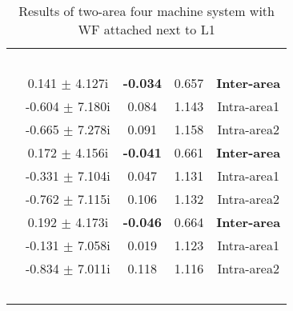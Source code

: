 \documentclass[conference,11pt]{IEEEtran}
\begin{document}
\begin{table}[t]
\centering
\caption{Results of two-area four machine system with WF attached next to L1}
\label{tab:table3}
\renewcommand{\arraystretch}{1}
\begin{tabular}{||c|c|c|c|c||}
\hline \hline
\multirow{2}{*}{\parbox{1.1cm}{\\}}  & 
\multirow{2}{*}{\parbox{1.4cm}{}} & 
\multirow{2}{*}{\parbox{1.1cm}{}} & 
\multirow{2}{*}{\parbox{0.8cm}{}} & 
\multirow{2}{*}{\parbox{1.2cm}{}}  \\
{}       &      {}     &         {} &      {}     &       {} \\ \hline
\hline 
\multirow{3}{*}{\centering {10\%WG}}    &0.141	$\pm$ 4.127i&	\bf{-0.034}&	0.657& \bf{Inter-area}\\
{}                                          &-0.604	$\pm$ 7.180i&	0.084&	1.143& Intra-area1\\
{}                                          &-0.665	$\pm$ 7.278i&	0.091&	1.158& Intra-area2\\ \hline
\multirow{3}{*}{\centering {25\%WG}}   &0.172	$\pm$ 4.156i&	\bf{-0.041}&	0.661& \bf{Inter-area}\\ 
{}                                          &-0.331	$\pm$ 7.104i&	0.047&	1.131& Intra-area1\\ 
{}                                         &-0.762	$\pm$ 7.115i&	0.106&	1.132& Intra-area2\\ \hline
\multirow{3}{*}{\centering {35\%WG}}    &0.192	$\pm$ 4.173i&	\bf{-0.046}&	0.664& \bf{Inter-area}\\ 
{}                                         &-0.131	$\pm$ 7.058i&	0.019&	1.123& Intra-area1\\ 
{}                                          &-0.834	$\pm$ 7.011i&	0.118&	1.116& Intra-area2\\ \hline \hline
\multirow{2}{*}{\parbox{1.1cm}{\\}}  & 
\multirow{2}{*}{\parbox{1.4cm}{}} & 
\multirow{2}{*}{\parbox{1.1cm}{}} & 
\multirow{2}{*}{\parbox{0.8cm}{}} & 
\multirow{2}{*}{\parbox{1.2cm}{}}  \\

\end{tabular}
\end{table}
\end{document}
